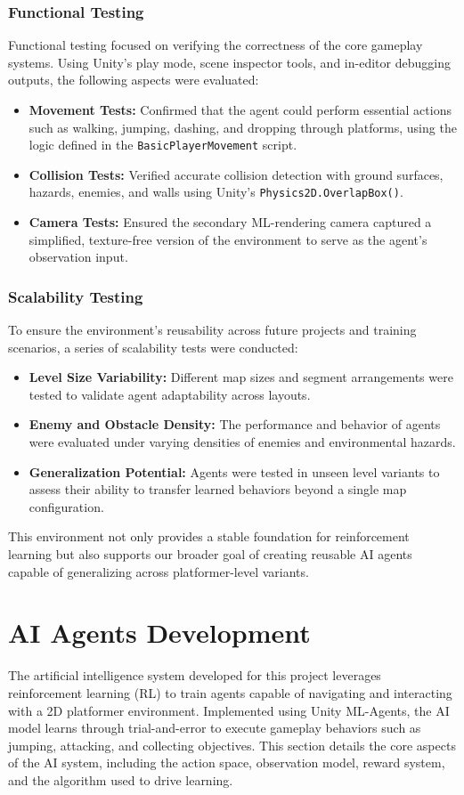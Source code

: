 \documentclass[12pt,oneside,openright,a4paper]{cpe-english-project}
\begin{document}
\subsubsection{Functional Testing}
Functional testing focused on verifying the correctness of the core gameplay systems. Using Unity’s play mode, scene inspector tools, and in-editor debugging outputs, the following aspects were evaluated:
\begin{itemize}
\item  \textbf{Movement Tests:} Confirmed that the agent could perform essential actions such as walking, jumping, dashing, and dropping through platforms, using the logic defined in the \texttt{BasicPlayerMovement} script.
\item  \textbf{Collision Tests:} Verified accurate collision detection with ground surfaces, hazards, enemies, and walls using Unity’s \texttt{Physics2D.OverlapBox()}.
\item  \textbf{Camera Tests:} Ensured the secondary ML-rendering camera captured a simplified, texture-free version of the environment to serve as the agent’s observation input.
\end{itemize}
\subsubsection{Scalability Testing}
To ensure the environment’s reusability across future projects and training scenarios, a series of scalability tests were conducted:
\begin{itemize}
\item  \textbf{Level Size Variability:} Different map sizes and segment arrangements were tested to validate agent adaptability across layouts.
\item  \textbf{Enemy and Obstacle Density:} The performance and behavior of agents were evaluated under varying densities of enemies and environmental hazards.
\item  \textbf{Generalization Potential:} Agents were tested in unseen level variants to assess their ability to transfer learned behaviors beyond a single map configuration.
\end{itemize}

This environment not only provides a stable foundation for reinforcement learning but also supports our broader goal of creating reusable AI agents capable of generalizing across platformer-level variants.
	
\section{AI Agents Development}
The artificial intelligence system developed for this project leverages reinforcement learning (RL) to train agents capable of navigating and interacting with a 2D platformer environment. Implemented using Unity ML-Agents, the AI model learns through trial-and-error to execute gameplay behaviors such as jumping, attacking, and collecting objectives. This section details the core aspects of the AI system, including the action space, observation model, reward system, and the algorithm used to drive learning.
\end{document}
